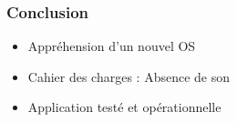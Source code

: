   \begin{frame}
   \frametitle{Conclusion}
 \begin{itemize}
    \item Appréhension d'un nouvel OS
    \item Cahier des charges : Absence de son
    \item Application testé et opérationnelle
   \end{itemize}
\end{frame}